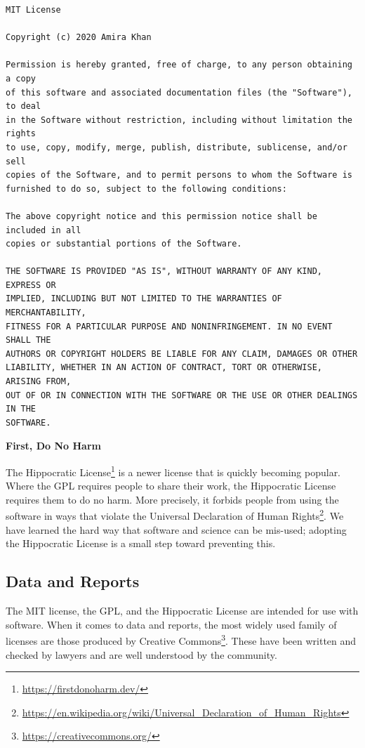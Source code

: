 \documentclass[
]{krantz}
\renewenvironment{quote}{\begin{VF}}{\end{VF}}
\renewcommand{\href}[2]{#2\footnote{\url{#1}}}
\begin{document}
\begin{verbatim}
MIT License

Copyright (c) 2020 Amira Khan

Permission is hereby granted, free of charge, to any person obtaining a copy
of this software and associated documentation files (the "Software"), to deal
in the Software without restriction, including without limitation the rights
to use, copy, modify, merge, publish, distribute, sublicense, and/or sell
copies of the Software, and to permit persons to whom the Software is
furnished to do so, subject to the following conditions:

The above copyright notice and this permission notice shall be included in all
copies or substantial portions of the Software.

THE SOFTWARE IS PROVIDED "AS IS", WITHOUT WARRANTY OF ANY KIND, EXPRESS OR
IMPLIED, INCLUDING BUT NOT LIMITED TO THE WARRANTIES OF MERCHANTABILITY,
FITNESS FOR A PARTICULAR PURPOSE AND NONINFRINGEMENT. IN NO EVENT SHALL THE
AUTHORS OR COPYRIGHT HOLDERS BE LIABLE FOR ANY CLAIM, DAMAGES OR OTHER
LIABILITY, WHETHER IN AN ACTION OF CONTRACT, TORT OR OTHERWISE, ARISING FROM,
OUT OF OR IN CONNECTION WITH THE SOFTWARE OR THE USE OR OTHER DEALINGS IN THE
SOFTWARE.
\end{verbatim}

\begin{quote}
\textbf{First, Do No Harm}

The \href{https://firstdonoharm.dev/}{Hippocratic License}
is a newer license
that is quickly becoming popular.
Where the GPL requires people to share their work,
the Hippocratic License requires them to do no harm.
More precisely,
it forbids people from using the software in ways that violate
the \href{https://en.wikipedia.org/wiki/Universal_Declaration_of_Human_Rights}{Universal Declaration of Human Rights}.
We have learned the hard way that software and science can be mis-used;
adopting the Hippocratic License is a small step toward preventing this.
\end{quote}

\hypertarget{teams-license-other}{%
\subsection{Data and Reports}\label{teams-license-other}}

The MIT license, the GPL, and the Hippocratic License are intended for use with software.
When it comes to data and reports,
the most widely used family of licenses are those produced
by \href{https://creativecommons.org/}{Creative Commons}.
These have been written and checked by lawyers and are well understood by the community.
\end{document}
